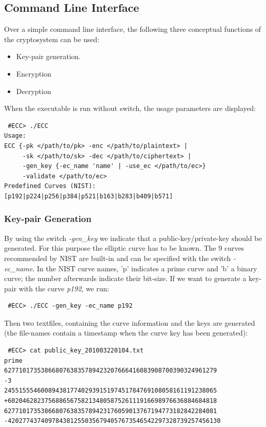 \documentclass[11pt,english]{article}
\begin{document}
\subsection{Command Line Interface}
Over a simple command line interface, the following three conceptual functions of the cryptosystem can be used:
\begin{itemize}
 \item Key-pair generation.
 \item Encryption
 \item Decryption
\end{itemize}

When the executable is run without switch, the usage parameters are displayed:

\begin{verbatim}
 #ECC> ./ECC
Usage:
ECC {-pk </path/to/pk> -enc </path/to/plaintext> |
     -sk </path/to/sk> -dec </path/to/ciphertext> |
     -gen_key {-ec_name 'name' | -use_ec </path/to/ec>}
     -validate </path/to/ec>
Predefined Curves (NIST): [p192|p224|p256|p384|p521|b163|b283|b409|b571]
\end{verbatim}

\subsubsection{Key-pair Generation}
By using the switch \emph{-gen\_key} we indicate that a public-key/private-key should be generated. For this purpose the elliptic curve has to be known. The 9 curves recommended by NIST are built-in and can be specified with the switch \emph{-ec\_name}. In the NIST curve names, 'p' indicates a prime curve and 'b' a binary curve; the number afterwards indicate their bit-size. If we want to generate a key-pair with the curve \emph{p192}, we run:

\begin{verbatim}
 #ECC> ./ECC -gen_key -ec_name p192
\end{verbatim}

Then two textfiles, containing the curve information and the keys are generated (the file-names contain a timestamp when the curve key has been generated):

\begin{verbatim}
 #ECC> cat public_key_201003220104.txt
prime
6277101735386680763835789423207666416083908700390324961279
-3
2455155546008943817740293915197451784769108058161191238065
+602046282375688656758213480587526111916698976636884684818
6277101735386680763835789423176059013767194773182842284081
-4202774374097843812550356794057673546542297328739257456130
\end{verbatim}
\end{document}

